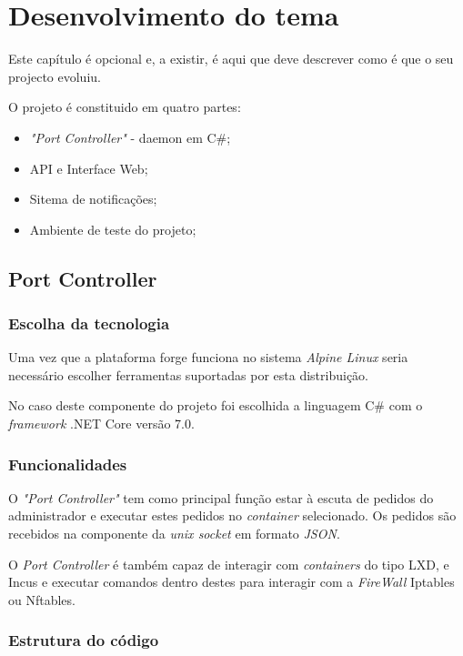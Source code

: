 \chapter{Desenvolvimento do tema}
\label{cap:experiments}

Este capítulo é opcional e, a existir, é aqui que deve descrever como é que o seu projecto evoluiu.

O projeto é constituido em quatro partes:

\begin{itemize}
    \item \textit{"Port Controller"} - daemon em C\#;
    \item API e Interface Web;
    \item Sitema de notificações;
    \item Ambiente de teste do projeto;
\end{itemize}

\section{Port Controller}

\subsection{Escolha da tecnologia}

Uma vez que a plataforma forge funciona no sistema \textit{Alpine Linux} seria
necessário escolher ferramentas suportadas por esta distribuição.

No caso deste componente do projeto foi escolhida a linguagem C\# com o 
\textit{framework} .NET Core versão 7.0.


\subsection{Funcionalidades}

O \textit{"Port Controller"} tem como principal função estar à escuta de pedidos do
administrador e executar estes pedidos no \textit{container} selecionado. Os 
pedidos são recebidos na componente da \textit{unix socket} em formato
\textit{JSON}.

O \textit{Port Controller} é também capaz de interagir com \textit{containers}
do tipo LXD, e Incus e executar comandos dentro destes para interagir com a
\textit{FireWall} Iptables ou Nftables.

\subsection{Estrutura do código}


